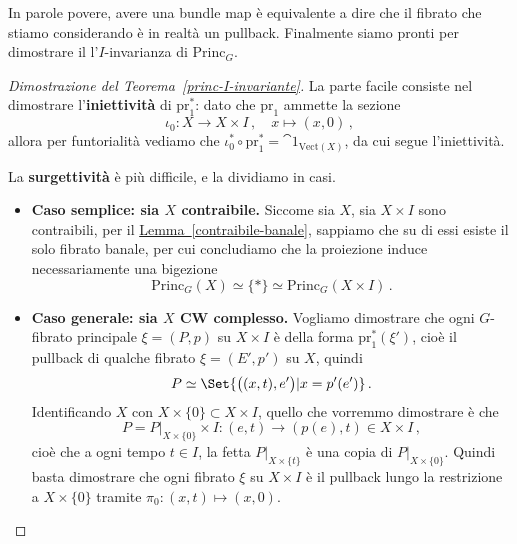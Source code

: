 In parole povere, avere una bundle map è equivalente
a dire che il fibrato che stiamo considerando è in realtà un pullback.
Finalmente siamo pronti per dimostrare il l'$I$-invarianza di $\mathrm{Princ}_{G}$.

	\begin{proof}[Dimostrazione del Teorema~\ref{princ-I-invariante}]
		La parte facile consiste nel dimostrare l'\textbf{iniettività} di $\mathrm{pr}_{1}^{*}$:
		dato che $\mathrm{pr}_{1}$ ammette la sezione 
		\begin{equation*}
			\iota_{0} : X \longrightarrow X \times I\,, \quad
			x \longmapsto (x,0)\,,
		\end{equation*}
		allora per funtorialità vediamo che 
		$	\iota_{0}^{*} \circ \mathrm{pr}_{1}^{*} = \cat{1}_{\mathrm{Vect}(X)} $,
		da cui segue l'iniettività.
		
		La \textbf{surgettività} è più difficile, e la dividiamo in casi.
		\begin{itemize}
			\item \textbf{Caso semplice: sia $X$ contraibile.} 
			Siccome sia $X$, sia $X \times I$ sono contraibili, 			
			per il \hyperref[contraibile-banale]{Lemma~\ref{contraibile-banale}},
			sappiamo che su di essi esiste il solo fibrato banale,
			per cui concludiamo che la proiezione induce necessariamente una bigezione
			 \begin{equation*}
			 	 \mathrm{Princ}_{G}(X) \simeq \{ \ast \} \simeq \mathrm{Princ}_{G}(X \times I)\,.
			 \end{equation*}
			 
			 \item \textbf{Caso generale: sia $X$ CW complesso.}
Vogliamo dimostrare che ogni $G$-fibrato principale 
$\xi = (P,p)$ su $X \times I$
è della forma $\mathrm{pr}_{1}^{*}(\xi')$,
cioè il pullback di qualche fibrato $\xi = (E',p')$ su $X$, quindi
\begin{equation*}
	P \simeq \Set{ \big( (x,t),e' \big) | x = p'(e') }\,.
\end{equation*}
Identificando $X$ con $X \times \{0\} \subset X \times I$,
quello che vorremmo dimostrare è che
 $$P = P\vert_{X \times \{0\}} \times I : (e,t) \to (p(e),t) \in X \times I \,,$$
cioè che a ogni tempo $t \in I$, la fetta $P\vert_{X \times \{t\}}$ è una
copia di $P\vert_{X \times \{0\}}$.
Quindi basta dimostrare che ogni fibrato $\xi$ su $X \times I$
è il pullback lungo la restrizione a $X \times \{0\}$ tramite $\pi_{0} : (x,t) \mapsto (x,0)$.


\end{itemize}
\end{proof}
